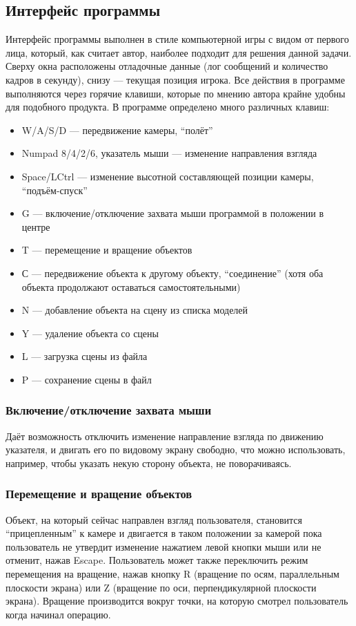 \documentclass[a4paper,12pt]{report}
\numberwithin{equation}{section}
\begin{document}
\subsection{Интерфейс программы}
Интерфейс программы выполнен в стиле компьютерной игры с видом от первого лица, который, как считает автор, наиболее подходит для решения данной задачи. Сверху окна расположены отладочные данные (лог сообщений и количество кадров в секунду), снизу --- текущая позиция игрока. Все действия в программе выполняются через горячие клавиши, которые по мнению автора крайне удобны для подобного продукта. В программе определено много различных клавиш:
\begin{itemize}
\item W/A/S/D --- передвижение камеры, ``полёт''
\item Numpad 8/4/2/6, указатель мыши --- изменение направления взгляда
\item Space/LCtrl --- изменение высотной составляющей позиции камеры, ``подъём-спуск''
\item G --- включение/отключение захвата мыши программой в положении в центре
\item T --- перемещение и вращение объектов
\item С --- передвижение объекта к другому объекту, ``соединение'' (хотя оба объекта продолжают оставаться самостоятельными)
\item N --- добавление объекта на сцену из списка моделей
\item Y --- удаление объекта со сцены
\item L --- загрузка сцены из файла
\item P --- сохранение сцены в файл
\end{itemize}

\subsubsection{Включение/отключение захвата мыши}
Даёт возможность отключить изменение направление взгляда по движению указателя, и двигать его по видовому экрану свободно, что можно использовать, например, чтобы указать некую сторону объекта, не поворачиваясь.

\subsubsection{Перемещение и вращение объектов}
Объект, на который сейчас направлен взгляд пользователя, становится ``прицепленным'' к камере и двигается в таком положении за камерой пока пользователь не утвердит изменение нажатием левой кнопки мыши или не отменит, нажав Escape. Пользователь может также переключить режим перемещения на вращение, нажав кнопку R (вращение по осям, параллельным плоскости экрана) или Z (вращение по оси, перпендикулярной плоскости экрана). Вращение производится вокруг точки, на которую смотрел пользователь когда начинал операцию.
\end{document}
